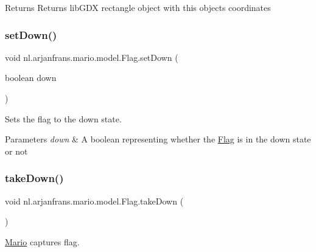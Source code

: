\begin{DoxyReturn}{Returns}
Returns lib\+G\+DX rectangle object with this objects coordinates 
\end{DoxyReturn}
\mbox{\label{classnl_1_1arjanfrans_1_1mario_1_1model_1_1Flag_a782bc6aff5cbac7ae16c17e31f2d8887}} 
\subsubsection{\texorpdfstring{set\+Down()}{setDown()}}
{\footnotesize\ttfamily void nl.\+arjanfrans.\+mario.\+model.\+Flag.\+set\+Down (\begin{DoxyParamCaption}\item[{boolean}]{down }\end{DoxyParamCaption})}



Sets the flag to the down state. 


\begin{DoxyParams}{Parameters}
{\em down} & A boolean representing whether the \hyperlink{classnl_1_1arjanfrans_1_1mario_1_1model_1_1Flag}{Flag} is in the down state or not \\
\hline
\end{DoxyParams}
\mbox{\label{classnl_1_1arjanfrans_1_1mario_1_1model_1_1Flag_accca18a710db846a8479e60be7fcc847}} 
\subsubsection{\texorpdfstring{take\+Down()}{takeDown()}}
{\footnotesize\ttfamily void nl.\+arjanfrans.\+mario.\+model.\+Flag.\+take\+Down (\begin{DoxyParamCaption}{ }\end{DoxyParamCaption})}



\hyperlink{classnl_1_1arjanfrans_1_1mario_1_1model_1_1Mario}{Mario} captures flag. 

